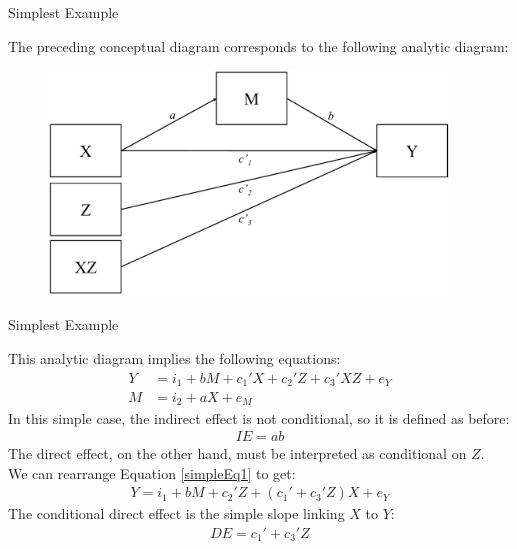 \documentclass{beamer}
\newcommand{\va}[0]{\vspace{12pt}}
\newcommand{\vb}[0]{\vspace{6pt}}
\begin{document}
\begin{frame}{Simplest Example}
  
  The preceding conceptual diagram corresponds to the following
  analytic diagram: 
  \vb
  \begin{figure}
    \includegraphics[width=0.95\textwidth]{figures/modCwithZAnalytic.pdf}
  \end{figure}
  
\end{frame}



\begin{frame}{Simplest Example}
  
  This analytic diagram implies the following equations:
  \begin{align}
    Y &= i_1 + bM + c_1'X + c_2'Z + c_3'XZ + e_Y \label{simpleEq1}\\
    M &= i_2 + aX + e_M
  \end{align}
  \pause
  In this simple case, the indirect effect is not conditional, so it
  is defined as before:
  \begin{align*}
    IE = ab
  \end{align*}
  \pause
  The direct effect, on the other hand, must be interpreted as
  conditional on $Z$.\\ 
  \va 
  \pause
  We can rearrange Equation \ref{simpleEq1} to get:
  \begin{align*}
    Y = i_1 + bM + c_2'Z + \left( c_1' + c_3'Z \right)X + e_Y
  \end{align*}
  The conditional direct effect is the simple slope linking $X$ to $Y$:
  \begin{align*}
    DE = c_1' + c_3'Z
  \end{align*}
  
\end{frame}
\end{document}
